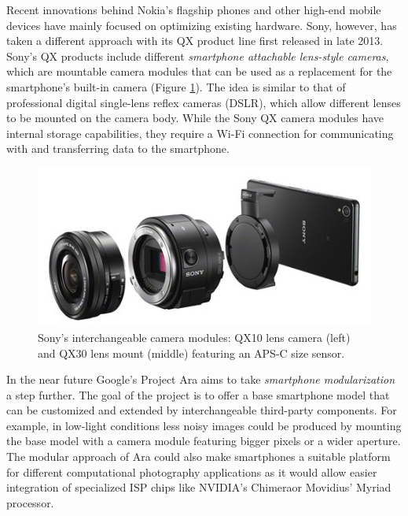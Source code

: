\documentclass[thesis.tex]{subfiles}
\begin{document}
Recent innovations behind Nokia's flagship phones and other high-end mobile devices have mainly focused on optimizing existing hardware. Sony, however, has taken a different approach with its QX product line first released in late 2013. Sony's QX products include different \textit{smartphone attachable lens-style cameras}, which are mountable camera modules that can be used as a replacement for the smartphone's built-in camera (Figure \ref{figure:sony-qx}). The idea is similar to that of professional digital single-lens reflex cameras (DSLR), which allow different lenses to be mounted on the camera body. While the Sony QX camera modules have internal storage capabilities, they require a Wi-Fi connection for communicating with and transferring data to the smartphone.

\begin{figure}[h]
\centering \includegraphics[width=\textwidth]{images/sony_qx.jpg}
\caption{Sony's interchangeable camera modules: QX10 lens camera (left) and QX30 lens mount (middle) featuring an APS-C size sensor.\label{figure:sony-qx} \cite{sony_qx}}
\end{figure}

In the near future Google's Project Ara aims to take \textit{smartphone modularization} a step further. The goal of the project is to offer a base smartphone model that can be customized and extended by interchangeable third-party components. For example, in low-light conditions less noisy images could be produced by mounting the base model with a camera module featuring bigger pixels or a wider aperture. The modular approach of Ara could also make smartphones a suitable platform for different computational photography applications as it would allow easier integration of specialized ISP chips like NVIDIA's Chimera\texttrademark or Movidius' Myriad processor.
\end{document}
